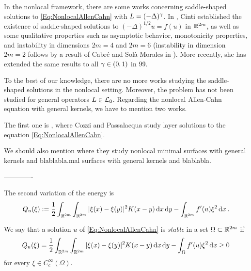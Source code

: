 In the nonlocal framework, there are some works concerning saddle-shaped solutions to \eqref{Eq:NonlocalAllenCahn} with $L= (-\Delta)^\gamma$. In  \cite{Cinti-Saddle}, Cinti established the existence of saddle-shaped solutions to $(-\Delta)^{1/2}u = f(u)$ in $\mathbb{R}^{2m}$, as well as some qualitative properties such as asymptotic behavior, monotonicity properties, and instability in dimensions $2m = 4$ and $2m = 6$ (instability in dimension $2m=2$ follows by a result of Cabré and Solà-Morales in \cite{CabreSolaMorales}). More recently, she has extended the same results to all $\gamma \in (0,1)$ in 99.


To the best of our knowledge, there are no more works studying the saddle-shaped solutions in the nonlocal setting. Moreover, the problem has not been studied for general operators $L\in \mathcal{L}_0$. Regarding the nonlocal Allen-Cahn equation with general kernels, we have to mention two works.

The first one is \cite{CozziPassalacqua}, where Cozzi and Passalacqua study layer solutions to the equation \eqref{Eq:NonlocalAllenCahn}.

We should also mention \cite{DipierroSerraValdinoci} where they study nonlocal minimal surfaces with general kernels and blablabla.mal surfaces with general kernels and blablabla.



\bigskip
\bigskip
\bigskip
-------------
\bigskip
\bigskip
\bigskip









The second variation of the energy is
\begin{equation}
 \label{Eq:SecondVariation}	
 Q_u(\xi) := \dfrac{1}{2} \int_{\mathbb{R}^{2m}} \int_{\mathbb{R}^{2m}} |\xi (x) - \xi(y)|^2 K(x - y) \,\mathrm{d} x \,\mathrm{d} y - \int_{\mathbb{R}^{2m}} f'(u) \xi^2 \,\mathrm{d} x\,.
\end{equation}

\begin{definition}
	\label{Def:Stability}
	We say that a solution $u$ of \eqref{Eq:NonlocalAllenCahn} is \emph{stable} in a set $\Omega \subset \mathbb{R}^{2m}$ if 
	\begin{equation}
	\label{Eq:StablityCondition}	
	Q_u(\xi) = \dfrac{1}{2} \int_{\mathbb{R}^{2m}} \int_{\mathbb{R}^{2m}} |\xi (x) - \xi(y)|^2 K(x - y) \,\mathrm{d} x \,\mathrm{d} y - \int_{\Omega} f'(u) \xi^2 \,\mathrm{d} x \geq 0
	\end{equation}
	for every $\xi \in C^\infty_c (\Omega)$.
\end{definition}

